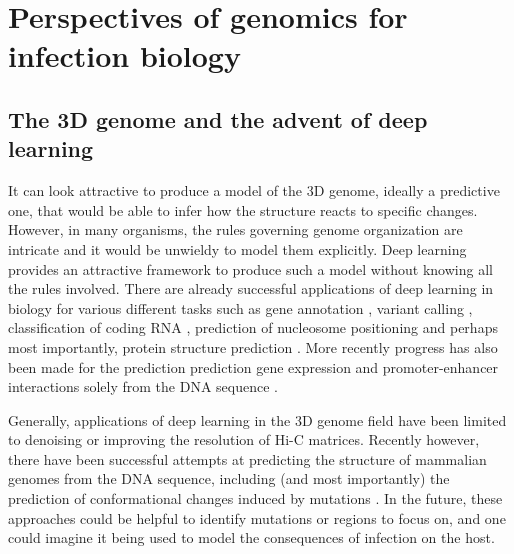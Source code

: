 
\chapter{Perspectives of genomics for infection biology} %

\label{ch:03-02} %


\section{The 3D genome and the advent of deep learning}
It can look attractive to produce a model of the 3D genome, ideally a predictive one, that would be able to infer how the structure reacts to specific changes. However, in many organisms, the rules governing genome organization are intricate and it would be unwieldy to model them explicitly. Deep learning provides an attractive framework to produce such a model without knowing all the rules involved. There are already successful applications of deep learning in biology for various different tasks such as gene annotation \cite{stiehlerHelixerCrossspeciesGene2020,khodabandelouGenomeAnnotationSpecies2020}, variant calling \cite{poplinUniversalSNPSmallindel2018}, classification of coding RNA \cite{hillDeepRecurrentNeural2018}, prediction of nucleosome positioning \cite{routhierGenomewidePredictionDNA2021} and perhaps most importantly, protein structure prediction \cite{jumperHighlyAccurateProtein2021}. More recently progress has also been made for the prediction prediction gene expression and promoter-enhancer interactions solely from the DNA sequence \cite{avsecEffectiveGeneExpression2021}.

Generally, applications of deep learning in the 3D genome field have been limited to denoising or improving the resolution of Hi-C matrices. Recently however, there have been successful attempts at predicting the structure of mammalian genomes from the DNA sequence, including (and most importantly) the prediction of conformational changes induced by mutations \cite{fudenbergPredicting3DGenome2020,schwessingerDeepCPredicting3D2020}. In the future, these approaches could be helpful to identify mutations or regions to focus on, and one could imagine it being used to model the consequences of infection on the host.

